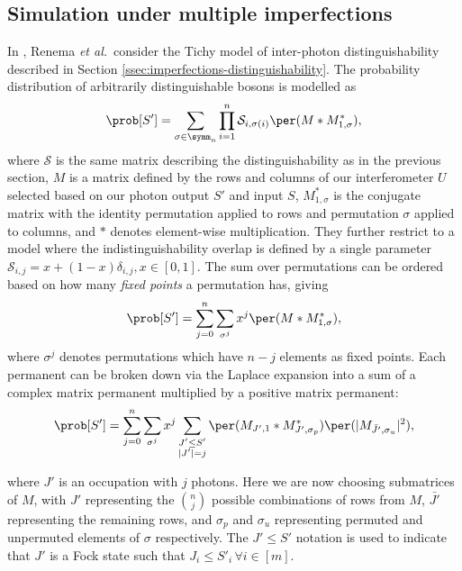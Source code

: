 \subsection{Simulation under multiple imperfections}
\label{sec:renema-review}

In \cite{renema2018, renema2018loss}, Renema \textit{et al.}\ consider the Tichy model of inter-photon distinguishability described in Section \ref{ssec:imperfections-distinguishability}. 
The probability distribution of arbitrarily distinguishable bosons is modelled as
\begin{equation}
\prob[S'] = \sum_{\sigma\in\symm_n}\prod_{i=1}^n\mathcal{S}_{i,\sigma(i)}\per(M*M^*_{1,\sigma}) ,
\end{equation}
where $\mathcal{S}$ is the same matrix describing the distinguishability as in the previous section, $M$ is a matrix defined by the rows and columns of our interferometer $U$ selected based on our photon output $S'$ and input $S$, $M^*_{1,\sigma}$ is the conjugate matrix with the identity permutation applied to rows and permutation $\sigma$ applied to columns, and $*$ denotes element-wise multiplication. 
They further restrict to a model where the indistinguishability overlap is defined by a single parameter $\mathcal{S}_{i,j} = x + (1-x)\delta_{i,j}, x \in [0,1]$.
The sum over permutations can be ordered based on how many \emph{fixed points} a permutation has, giving
\begin{equation}
\prob[S'] = \sum_{j=0}^n\sum_{\sigma^j}x^j\per(M*M^*_{1,\sigma}) , \label{eqn:renema-state}
\end{equation}
where $\sigma^j$ denotes permutations which have $n-j$ elements as fixed points.
Each permanent can be broken down via the Laplace expansion into a sum of a complex matrix permanent multiplied by a positive matrix permanent:
\begin{equation}
\prob[S'] = \sum_{j=0}^n\sum_{\sigma^j}x^j\sum_{\substack{J'\leq S'\\|J'|=j}}\per(M_{J',1}*M^*_{J',\sigma_p})\per(|M_{\bar{J'},\sigma_u}|^2) ,
\end{equation}

\noindent where $J'$ is an occupation with $j$ photons. Here we are now choosing submatrices of $M$, with $J'$ representing the $\binom{n}{j}$ possible combinations of rows from $M$, $\bar{J'}$ representing the remaining rows, and $\sigma_p$ and $\sigma_u$  representing permuted and unpermuted elements of $\sigma$ respectively.
The $J' \leq S'$ notation is used to indicate that $J'$ is a Fock state such that $J_i\leq S'_i \,\forall i\in[m]$.

